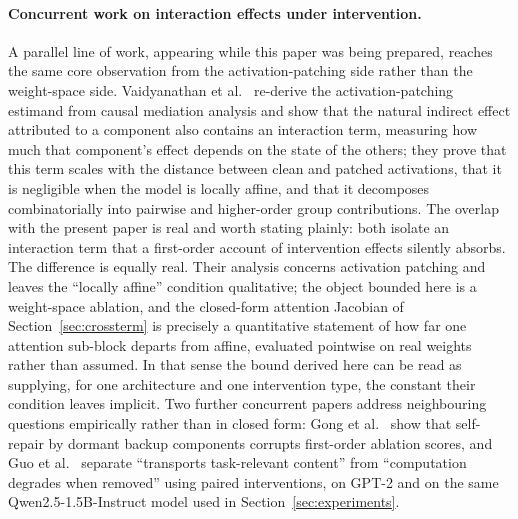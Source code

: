 \documentclass[11pt,a4paper]{article}
\begin{document}
\paragraph{Concurrent work on interaction effects under intervention.} A
parallel line of work, appearing while this paper was being prepared, reaches
the same core observation from the activation-patching side rather than the
weight-space side. Vaidyanathan et al.\ \cite{vaidyanathan2026mediators}
re-derive the activation-patching estimand from causal mediation analysis and
show that the natural indirect effect attributed to a component also contains
an interaction term, measuring how much that component's effect depends on the
state of the others; they prove that this term scales with the distance
between clean and patched activations, that it is negligible when the model is
locally affine, and that it decomposes combinatorially into pairwise and
higher-order group contributions. The overlap with the present paper is real
and worth stating plainly: both isolate an interaction term that a first-order
account of intervention effects silently absorbs. The difference is equally
real. Their analysis concerns activation patching and leaves the
``locally affine'' condition qualitative; the object bounded here is a
weight-space ablation, and the closed-form attention Jacobian of
Section~\ref{sec:crossterm} is precisely a quantitative statement of how far
one attention sub-block departs from affine, evaluated pointwise on real
weights rather than assumed. In that sense the bound derived here can be read
as supplying, for one architecture and one intervention type, the constant
their condition leaves implicit. Two further concurrent papers address
neighbouring questions empirically rather than in closed form: Gong et al.\
\cite{gong2026coablation} show that self-repair by dormant backup components
corrupts first-order ablation scores, and Guo et al.\ \cite{guo2026sobol}
separate ``transports task-relevant content'' from ``computation degrades when
removed'' using paired interventions, on GPT-2 and on the same
Qwen2.5-1.5B-Instruct model used in Section~\ref{sec:experiments}.
\end{document}
